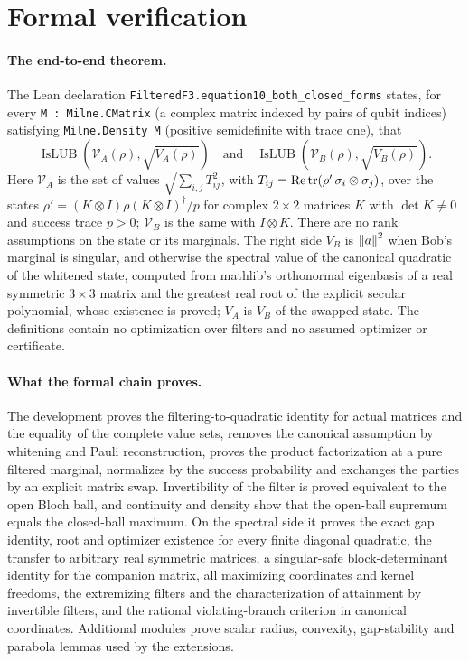\section{Formal verification}\label{sec:formal}

\paragraph{The end-to-end theorem.}
The Lean declaration
\texttt{FilteredF3.\allowbreak equation10\_\allowbreak both\_\allowbreak closed\_\allowbreak forms} states, for every
\texttt{M : Milne.CMatrix} (a complex matrix indexed by pairs of qubit
indices) satisfying \texttt{Milne.Density M} (positive semidefinite with
trace one), that
\[
 \operatorname{IsLUB}(\mathcal V_A(\rho),\sqrt{V_A(\rho)})
 \quad\text{and}\quad
 \operatorname{IsLUB}(\mathcal V_B(\rho),\sqrt{V_B(\rho)}).
\]
Here $\mathcal V_A$ is the set of values $\sqrt{\sum_{i,j}T_{ij}^2}$, with
$T_{ij}=\operatorname{Re}\operatorname{tr}(\rho'\,\sigma_i\otimes\sigma_j)$, over the
states $\rho'=(K\otimes I)\rho(K\otimes I)^\dagger/p$ for complex
$2\times2$ matrices $K$ with $\det K\neq0$ and success trace $p>0$;
$\mathcal V_B$ is the same with $I\otimes K$. There are no rank
assumptions on the state or its marginals. The right side $V_B$ is
$\left\lVert a\right\rVert^2$ when Bob's marginal is singular, and otherwise the spectral
value of the canonical quadratic of the whitened state, computed from
mathlib's orthonormal eigenbasis of a real symmetric $3\times3$ matrix and
the greatest real root of the explicit secular polynomial, whose existence
is proved; $V_A$ is $V_B$ of the swapped state. The definitions contain no
optimization over filters and no assumed optimizer or certificate.

\paragraph{What the formal chain proves.}
The development proves the filtering-to-quadratic identity for actual
matrices and the equality of the complete value sets, removes the canonical
assumption by whitening and Pauli reconstruction, proves the product
factorization at a pure filtered marginal, normalizes by the success
probability and exchanges the parties by an explicit matrix swap.
Invertibility of the filter is proved equivalent to the open Bloch ball, and
continuity and density show that the open-ball supremum equals the
closed-ball maximum. On the spectral side it proves the exact gap identity,
root and optimizer existence for every finite diagonal quadratic, the
transfer to arbitrary real symmetric matrices, a singular-safe
block-determinant identity for the companion matrix, all maximizing
coordinates and kernel freedoms, the extremizing filters and the
characterization of attainment by invertible filters, and the rational
violating-branch criterion in canonical coordinates. Additional modules
prove scalar radius, convexity, gap-stability and parabola lemmas used by the
extensions.

